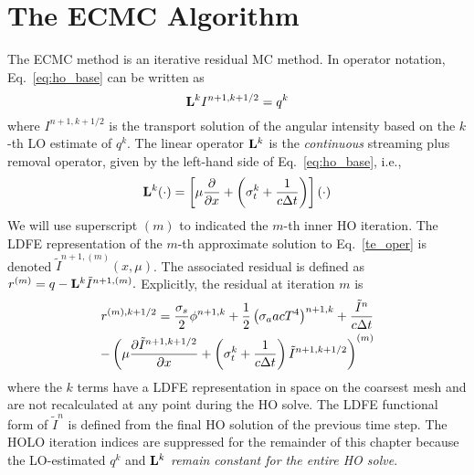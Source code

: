 \section{The ECMC Algorithm}
\label{sec:ecmc}

The ECMC method is an iterative residual MC method. 
In operator notation, Eq.~\eqref{eq:ho_base} can be written as
\begin{equation}\label{te_oper}
\mathbf{L}^k I^{n+1,k+1/2}  = q^{k}
\end{equation}
where $I^{n+1,k+1/2}$ is the transport solution of the angular intensity based on the
$k$-th LO estimate of $q^k$.
The linear operator $\mathbf{L}^k$ is the \emph{continuous} streaming plus
removal operator, given by the left-hand
side of Eq.~\eqref{eq:ho_base}, i.e.,
\begin{equation}
    \mathbf{L}^k(\cdot) = \left[\mu \frac{\partial }{\partial x} + \left(\sigma_t^k + \frac{1}{c \Delta t
    }\right)\right] \left(\cdot\right)
\end{equation}
We will use superscript $(m)$ to indicated the $m$-th inner HO iteration.  The LDFE
representation of the $m$-th
approximate solution to Eq.~\eqref{te_oper} is denoted
$\tilde{I}^{n+1,(m)}(x,\mu)$.    
The associated residual is defined as $r^{(m)} = q - \mathbf{L}^k\tilde{I}^{n+1,(m)}.$ 
Explicitly, the residual at iteration $m$ is
\begin{multline}\label{eq:resid}
r^{(m),k+1/2} = \frac{\sigma_s}{2} \phi^{n+1,k} +\frac{1}{2} \left(\sigma_a a c T^4
\right)^{n+1,k} + \frac{\tilde{I}^n}{c \Delta t } \\ -
\left(\mu \frac{\partial \tilde{I}^{n+1,k+1/2}}{\partial x} +
\left(\sigma_t^k + \frac{1}{c \Delta t }\right) \tilde{I}^{n+1,k+1/2}\right)^{(m)}
\end{multline}
where the $k$ terms have a LDFE representation in space on the coarsest mesh and are not recalculated at any point during
the HO solve.  The LDFE functional form of $\tilde{I}^n$ is defined from the final HO
solution of the previous time step.  The HOLO iteration indices are suppressed for the
remainder of this chapter because the LO-estimated $q^{k}$ and $\mathbf{L}^{k}$
\emph{remain constant for the entire HO solve}.

